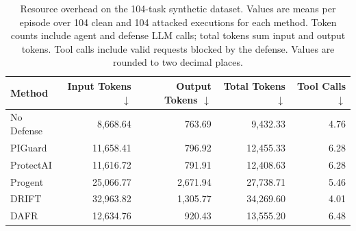 \documentclass{article}
\begin{document}
\begin{table}[t]
\centering
\small
\begin{tabular}{lrrrr}
\toprule
Method & Input Tokens $\downarrow$ & Output Tokens $\downarrow$ & Total Tokens $\downarrow$ & Tool Calls $\downarrow$ \\
\midrule
No Defense & 8,668.64 & 763.69 & 9,432.33 & 4.76 \\
PIGuard & 11,658.41 & 796.92 & 12,455.33 & 6.28 \\
ProtectAI & 11,616.72 & 791.91 & 12,408.63 & 6.28 \\
Progent & 25,066.77 & 2,671.94 & 27,738.71 & 5.46 \\
DRIFT & 32,963.82 & 1,305.77 & 34,269.60 & 4.01 \\
DAFR & 12,634.76 & 920.43 & 13,555.20 & 6.48 \\
\bottomrule
\end{tabular}
\caption{Resource overhead on the 104-task synthetic dataset. Values are means per episode over 104 clean and 104 attacked executions for each method. Token counts include agent and defense LLM calls; total tokens sum input and output tokens. Tool calls include valid requests blocked by the defense. Values are rounded to two decimal places.}
\label{tab:synthetic-resource-overhead}
\end{table}
\end{document}
